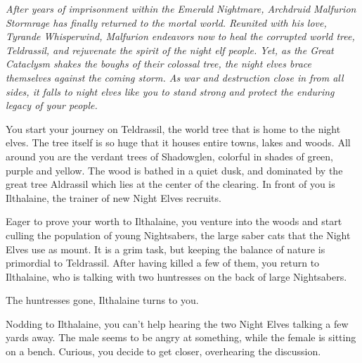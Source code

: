 \textit{After years of imprisonment within the Emerald Nightmare, Archdruid Malfurion Stormrage has finally returned to the mortal world. Reunited with his love, Tyrande Whisperwind, Malfurion endeavors now to heal the corrupted world tree, Teldrassil, and rejuvenate the spirit of the night elf people. Yet, as the Great Cataclysm shakes the boughs of their colossal tree, the night elves brace themselves against the coming storm. As war and destruction close in from all sides, it falls to night elves like you to stand strong and protect the enduring legacy of your people.}

You start your journey on Teldrassil, the world tree that is home to the night elves. The tree itself is so huge that it houses entire towns, lakes and woods. All around you are the verdant trees of Shadowglen, colorful in shades of green, purple and yellow. The wood is bathed in a quiet dusk, and dominated by the great tree Aldrassil which lies at the center of the clearing. In front of you is Ilthalaine, the trainer of new Night Elves recruits.



Eager to prove your worth to Ilthalaine, you venture into the woods and start culling the population of young Nightsabers, the large saber cats that the Night Elves use as mount. It is a grim task, but keeping the balance of nature is primordial to Teldrassil. After having killed a few of them, you return to Ilthalaine, who is talking with two huntresses on the back of large Nightsabers.


The huntresses gone, Ilthalaine turns to you.


 

Nodding to Ilthalaine, you can't help hearing the two Night Elves talking a few yards away. The male seems to be angry at something, while the female is sitting on a bench. Curious, you decide to get closer, overhearing the discussion.


